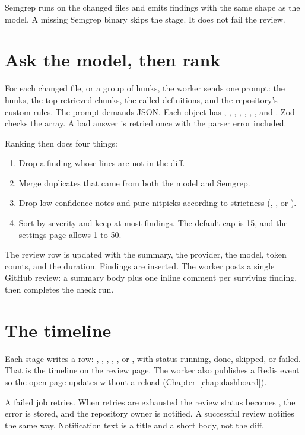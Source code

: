 Semgrep runs on the changed files and emits findings with the same shape as the model. A missing Semgrep binary skips the stage. It does not fail the review.

\section{Ask the model, then rank}

For each changed file, or a group of hunks, the worker sends one prompt: the hunks, the top retrieved chunks, the called definitions, and the repository's custom rules. The prompt demands JSON. Each object has , , , , , , , and . Zod checks the array. A bad answer is retried once with the parser error included.

Ranking then does four things:

\begin{enumerate}
  \item Drop a finding whose lines are not in the diff.
  \item Merge duplicates that came from both the model and Semgrep.
  \item Drop low-confidence notes and pure nitpicks according to strictness (, , or ).
  \item Sort by severity and keep at most  findings. The default cap is 15, and the settings page allows 1 to 50.
\end{enumerate}

The review row is updated with the summary, the provider, the model, token counts, and the duration. Findings are inserted. The worker posts a single GitHub review: a summary body plus one inline comment per surviving finding, then completes the check run.

\section{The timeline}

Each stage writes a  row: , , , , , or , with status running, done, skipped, or failed. That is the timeline on the review page. The worker also publishes a Redis event so the open page updates without a reload (Chapter~\ref{chap:dashboard}).

A failed job retries. When retries are exhausted the review status becomes , the error is stored, and the repository owner is notified. A successful review notifies the same way. Notification text is a title and a short body, not the diff.
